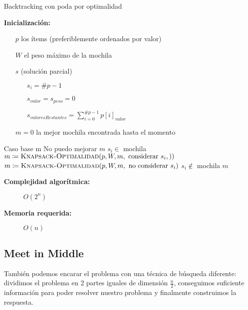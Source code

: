 \documentclass[fleqn, 11pt]{article}
\def\is{\coloneqq}
\begin{document}
\begin{algorithm}
\caption{Backtracking con poda por optimalidad}
\begin{algorithmic}[1]
\item[\textbf{Inicialización:}]
\item[] \begin{itemize}
	\item[] $p$ los ítems (preferiblemente ordenados por valor)
	\item[] $W$ el peso máximo de la mochila
	\item[] $s$ (solución parcial)
	\begin{itemize}
		\item[] $s_i = \#p - 1$
		\item[] $s_{valor} = s_{peso} = 0$
		\item[] $s_{valoresRestantes} = \sum_{i = 0}^{\#p - 1} p[i]_{valor}$
	\end{itemize}
	\item[] $m = 0$ la mejor mochila encontrada hasta el momento
\end{itemize}
\Statex
{}
	\Comment Caso base
	\State \Return m
\EndIf
{}
	\Comment No puedo mejorar
	\State \Return $m$
\EndIf
{}
	\Comment $s_i \in$ mochila
	\State $m \is \Call{Knapsack-Optimalidad}{p, W, m, \text{ considerar } s_i,)}$
\EndIf
\State $m \is \Call{Knapsack-Optimalidad}{p, W, m, \text{ no considerar } s_i}$
\Comment $s_i \not\in$ mochila
\State \Return $m$
\EndFunction
\end{algorithmic}
\begin{description}
	\item[\textbf{Complejidad algorítmica:}] $O(2^n)$
	\item[\textbf{Memoria requerida:}] $O(n)$
\end{description}
\end{algorithm}

\subsection{Meet in Middle}

También podemos encarar el problema con una técnica de búsqueda diferente:
dividimos el problema en 2 partes iguales de dimensión $\frac{n}{2}$,
conseguimos suficiente información para poder resolver nuestro problema y
finalmente construimos la respuesta.
\end{document}
